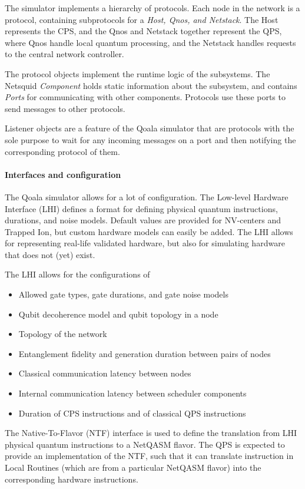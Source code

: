 The simulator implements a hierarchy of protocols. 
Each node in the network is a protocol, containing subprotocols for a \textit{Host, Qnos, and Netstack}. The Host represents the CPS, and the Qnos and Netstack together represent the QPS, where Qnos handle local quantum processing, and the Netstack handles requests to the central network controller. 

The protocol objects implement the runtime logic of the subsystems.
The Netsquid \textit{Component} holds static information about the subsystem, and contains \textit{Ports} for communicating with other components. Protocols use these ports to send messages to other protocols. 

Listener objects are a feature of the Qoala simulator that are protocols with the sole purpose to wait for any incoming messages on a port and then notifying the corresponding protocol of them.

\paragraph{Interfaces and configuration}
The Qoala simulator allows for a lot of configuration.
The Low-level Hardware Interface (LHI) defines a format for defining physical quantum instructions, durations, and noise models.
Default values are provided for NV-centers and Trapped Ion, but custom hardware models can easily be added.
The LHI allows for representing real-life validated hardware, but also for simulating hardware that does not (yet) exist.

The LHI allows for the configurations of
\begin{itemize}
    \item Allowed gate types, gate durations, and gate noise models
    \item Qubit decoherence model and qubit topology in a node
    \item Topology of the network
    \item Entanglement fidelity and generation duration between pairs of nodes
    \item Classical communication latency between nodes
    \item Internal communication latency between scheduler components
    \item Duration of CPS instructions and of classical QPS instructions
\end{itemize}

The Native-To-Flavor (NTF) interface is used to define the translation from LHI physical quantum instructions to a NetQASM flavor.
The QPS is expected to provide an implementation of the NTF, such that it can translate instruction in Local Routines (which are from a particular NetQASM flavor) into the corresponding hardware instructions.

